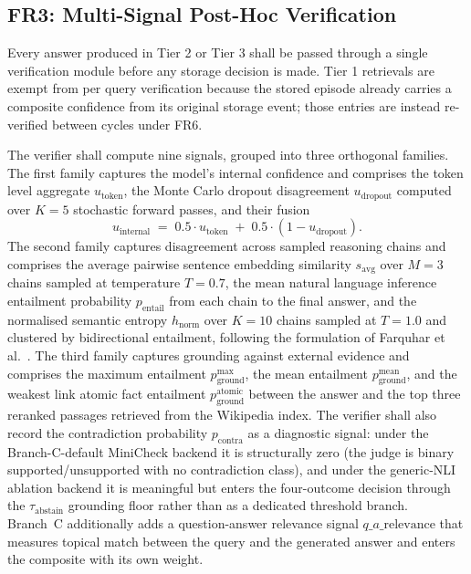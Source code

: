 \subsection{FR3: Multi-Signal Post-Hoc Verification}
\label{sec:fr3}

Every answer produced in Tier 2 or Tier 3 shall be passed through a single verification module before any storage decision is made. Tier 1 retrievals are exempt from per query verification because the stored episode already carries a composite confidence from its original storage event; those entries are instead re-verified between cycles under FR6.

The verifier shall compute nine signals, grouped into three orthogonal families. The first family captures the model's internal confidence and comprises the token level aggregate $u_{\text{token}}$, the Monte Carlo dropout disagreement $u_{\text{dropout}}$ computed over $K = 5$ stochastic forward passes, and their fusion
\begin{equation}
u_{\text{internal}} \;=\; 0.5 \cdot u_{\text{token}} \;+\; 0.5 \cdot (1 - u_{\text{dropout}}).
\label{eq:u-internal}
\end{equation}
The second family captures disagreement across sampled reasoning chains and comprises the average pairwise sentence embedding similarity $s_{\text{avg}}$ over $M = 3$ chains sampled at temperature $T = 0.7$, the mean natural language inference entailment probability $p_{\text{entail}}$ from each chain to the final answer, and the normalised semantic entropy $h_{\text{norm}}$ over $K = 10$ chains sampled at $T = 1.0$ and clustered by bidirectional entailment, following the formulation of Farquhar et al.\ \cite{farquhar2024semantic}. The third family captures grounding against external evidence and comprises the maximum entailment $p_{\text{ground}}^{\text{max}}$, the mean entailment $p_{\text{ground}}^{\text{mean}}$, and the weakest link atomic fact entailment $p_{\text{ground}}^{\text{atomic}}$ between the answer and the top three reranked passages retrieved from the Wikipedia index. The verifier shall also record the contradiction probability $p_{\text{contra}}$ as a diagnostic signal: under the Branch-C-default MiniCheck backend it is structurally zero (the judge is binary supported/unsupported with no contradiction class), and under the generic-NLI ablation backend it is meaningful but enters the four-outcome decision through the $\tau_{\text{abstain}}$ grounding floor rather than as a dedicated threshold branch. Branch~C additionally adds a question-answer relevance signal $q\_a\_\text{relevance}$ that measures topical match between the query and the generated answer and enters the composite with its own weight.

